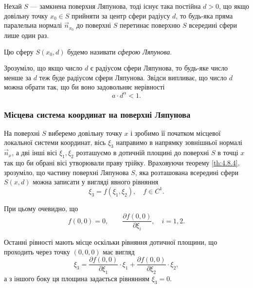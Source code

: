 \begin{theorem}
	\label{th:4.8.4}
	Нехай $S$ --- замкнена поверхня Ляпунова, тоді існує така постійна $d > 0$, що якщо довільну точку $x_0 \in S$ прийняти за центр сфери радіусу $d$, то будь-яка пряма паралельна нормалі $\vec n_{x_0}$ до поверхні $S$  перетинає поверхню $S$ всередині сфери лише один раз. 
\end{theorem}

\begin{definition}
	Цю сферу $S(x_0, d)$ будемо називати \textit{сферою Ляпунова}.
\end{definition}

\begin{remark}
	Зрозуміло, що якщо число $d$ є радіусом сфери Ляпунова, то будь-яке число менше за $d$ теж буде радіусом сфери Ляпунова. Звідси випливає, що число $d$ можна обрати так, що би воно задовольняє нерівності
	\begin{equation}
		\label{eq:4.8.10}
		a \cdot d^\alpha < 1.
	\end{equation}
\end{remark}

\subsubsection{Місцева система координат на поверхні Ляпунова}

На поверхні $S$ виберемо довільну точку $x$ і зробимо її початком місцевої локальної системи координат, вісь $\xi_3$ направимо в напрямку зовнішньої нормалі $\vec n_x$, а дві інші вісі $\xi_1, \xi_2$ розташуємо в дотичній площині до поверхні $S$ в точці $x$ так що би  обрані вісі утворювали праву трійку. Враховуючи теорему \ref{th:4.8.4}, зрозуміло, що частину поверхні Ляпунова $S$, яка розташована всередині сфери $S(x, d)$ можна записати у вигляді явного рівняння
\begin{equation}
	\label{eq:4.8.11}
	\xi_3 = f(\xi_1, \xi_2), \quad f \in C^1.
\end{equation}

При цьому очевидно, що
\begin{equation}
	\label{eq:4.8.12}
	f(0, 0) = 0, \qquad \frac{\partial f(0, 0)}{\partial \xi_i}, \quad i = 1, 2.
\end{equation}

Останні рівності мають місце оскільки рівняння дотичної площини, що проходить через точку $(0,0,0)$ має вигляд
\begin{equation}
	\xi_3 = \frac{\partial f(0, 0)}{\partial \xi_1} \cdot \xi_1 + \frac{\partial f(0, 0)}{\partial \xi_2} \cdot \xi_2,
\end{equation}
а з іншого боку ця площина задається рівнянням $\xi_3 = 0$.

